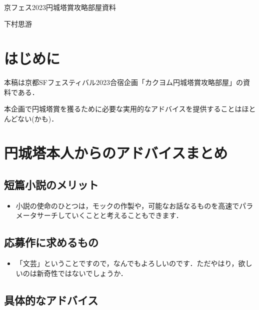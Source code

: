 \documentclass[10pt, a5paper, twoside]{jsarticle}
\theoremstyle{definition}
\begin{document}
	~ %

	\begin{center}

		\Large{京フェス2023円城塔賞攻略部屋資料}

		\vspace{3mm}
		
		\large{下村思游}

	\end{center}

	\vspace{3mm}

	\section{はじめに}

		本稿は京都SFフェスティバル2023合宿企画「カクヨム円城塔賞攻略部屋」の資料である．

		本企画で円城塔賞を獲るために必要な実用的なアドバイスを提供することはほとんどない(かも)．		

	\section{円城塔本人からのアドバイスまとめ}

		\subsection{短篇小説のメリット}

			\begin{itemize}
				\item 小説の使命のひとつは，モックの作製や，可能なお話なるものを高速でパラメータサーチしていくことと考えることもできます．\cite{int}
			\end{itemize}

		\subsection{応募作に求めるもの}

			\begin{itemize}
				\item 「文芸」ということですので，なんでもよろしいのです．ただやはり，欲しいのは新奇性ではないでしょうか．\cite{int}
			\end{itemize}

		\subsection{具体的なアドバイス}
\end{document}
